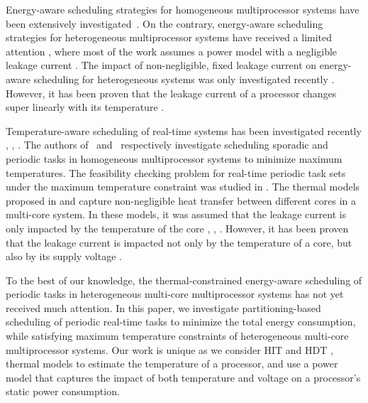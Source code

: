\documentclass[conference]{IEEEtran}
\begin{document}
Energy-aware %
scheduling strategies for homogeneous multiprocessor systems have been extensively investigated~\cite{Chen07}.
On the contrary, energy-aware scheduling strategies for heterogeneous multiprocessor systems have
received a limited attention \cite{Chen09}, where most of the work assumes a power model with a negligible leakage %
current \cite{Schranzhofer10}.
The impact of non-negligible, fixed leakage current on energy-aware scheduling for heterogeneous systems was only investigated recently \cite{Chen09}.
However, it has been proven that the leakage current of a processor changes super linearly with its temperature \cite{Liu07}. %

Temperature-aware scheduling of real-time systems
has been investigated recently
\cite{Chantem10}, \cite{Quan10}, \cite{Fisher09}.
The authors of~\cite{Fisher09} and~\cite{Chantem10} respectively investigate scheduling sporadic and periodic tasks in
homogeneous multiprocessor systems to minimize %
maximum temperatures.
The feasibility
checking problem for real-time periodic task sets under the maximum
temperature constraint was studied in \cite{Quan10}.
The thermal models proposed
in \cite{Chantem10} and \cite{Fisher09}  capture   non-negligible %
heat  transfer between different
cores in a multi-core system. In these models, it was assumed that the leakage current is only impacted
by the temperature of the core \cite{Chantem10}, \cite{Fisher09}, \cite{Liu07}.
However, it has been %
proven that the leakage current is impacted not only by the temperature of a core, but also by its supply voltage \cite{Quan10}.

To the best of our knowledge, the thermal-constrained energy-aware
scheduling of periodic tasks in heterogeneous multi-core multiprocessor  systems has not yet received much attention. In this paper, we investigate partitioning-based scheduling %
of periodic real-time tasks to minimize the total energy consumption, while satisfying maximum temperature constraints of
heterogeneous multi-core multiprocessor systems.
Our work is unique as we consider HIT \cite{Quan10} and HDT \cite{Chantem10}, \cite{Fisher09} thermal models to estimate the temperature of a processor, and use a power model
that captures the impact of both temperature \cite{Fisher09} and voltage \cite{Quan10} on a processor's static power consumption.
\end{document}
